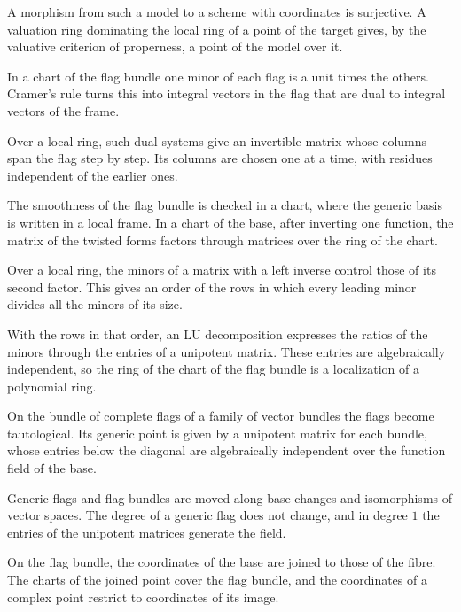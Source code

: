 A morphism from such a model to a scheme with coordinates is surjective. A valuation ring dominating the local ring of a point of
the target gives, by the valuative criterion of properness, a point of the model over it.

In a chart of the flag bundle one minor of each flag is a unit times the others. Cramer's rule turns this into integral vectors in
the flag that are dual to integral vectors of the frame.

Over a local ring, such dual systems give an invertible matrix whose columns span the flag step by step. Its columns are chosen one
at a time, with residues independent of the earlier ones.

The smoothness of the flag bundle is checked in a chart, where the generic basis is written in a local frame. In a chart of the base,
after inverting one function, the matrix of the twisted forms factors through matrices over the ring of the chart.

Over a local ring, the minors of a matrix with a left inverse control those of its second factor. This gives an order of the rows in
which every leading minor divides all the minors of its size.

With the rows in that order, an LU decomposition expresses the ratios of the minors through the entries of a unipotent matrix. These
entries are algebraically independent, so the ring of the chart of the flag bundle is a localization of a polynomial ring.

On the bundle of complete flags of a family of vector bundles the flags become tautological. Its generic point is given by a
unipotent matrix for each bundle, whose entries below the diagonal are algebraically independent over the function field of
the base.

Generic flags and flag bundles are moved along base changes and isomorphisms of vector spaces. The degree of a generic flag
does not change, and in degree $1$ the entries of the unipotent matrices generate the field.

On the flag bundle, the coordinates of the base are joined to those of the fibre. The charts of the joined point cover the
flag bundle, and the coordinates of a complex point restrict to coordinates of its image.

